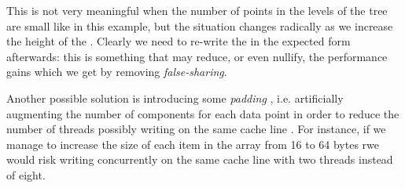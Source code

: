 \documentclass{article}
\begin{document}
This is not very meaningful when the number of points in the levels of the tree
are small like in this example, but the situation changes radically as we
increase the height of the \kdtree{}. Clearly we need to re-write the \kdtree{}
in the expected form afterwards: this is something that may reduce, or even
nullify, the performance gains which we get by removing \emph{false-sharing}.

Another possible solution is introducing some \emph{padding}
\cite{hager2010introduction}, i.e. artificially augmenting the number of
components for each data point in order to reduce the number of threads possibly
writing on the same cache line . For instance, if we manage to increase the size
of each item in the array from 16 to 64 bytes rwe would risk writing
concurrently on the same cache line with two threads instead of eight.
\end{document}
